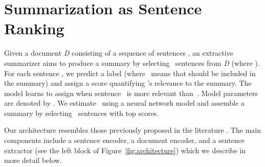 \documentclass[11pt,a4paper]{article}
\newcommand\doc{{\it D }}
\newcommand\sentseq{{} }
\begin{document}
\begin{figure*}[t!]
{
  }
  \caption{Extractive summarization model with reinforcement learning:
    a hierarchical encoder-decoder model ranks sentences for their
    extract-worthiness and a candidate summary is assembled from the
    top ranked sentences; the REWARD generator compares the candidate
    against the gold summary to give a reward which is used in the
    REINFORCE algorithm \protect\cite{Williams:1992} to update the
    model.} \label{fig:architecture}
\end{figure*}


\section{Summarization as Sentence Ranking}
\label{sec:extr-summ-as}







Given a document \doc consisting of a sequence of sentences \sentseq, an
extractive summarizer aims to produce a summary  by
selecting~ sentences from \doc (where ). For each sentence
\mbox{}, we predict a label  (where~
means that  should be included in the summary) and assign a score
 quantifying 's relevance to the
summary.  The model learns to assign  when sentence~ is more relevant
than~. Model parameters are denoted by .  We
estimate~ using a neural network model and
assemble a summary  by selecting~ sentences with top
 scores.

Our architecture resembles those previously proposed in the literature
\cite{jp-acl16,nallapati17,narayan-arxiv17}.  The main components
include a sentence encoder, a document encoder, and a sentence
extractor (see the left block of Figure~\ref{fig:architecture}) which
we describe in more detail below.
\end{document}
